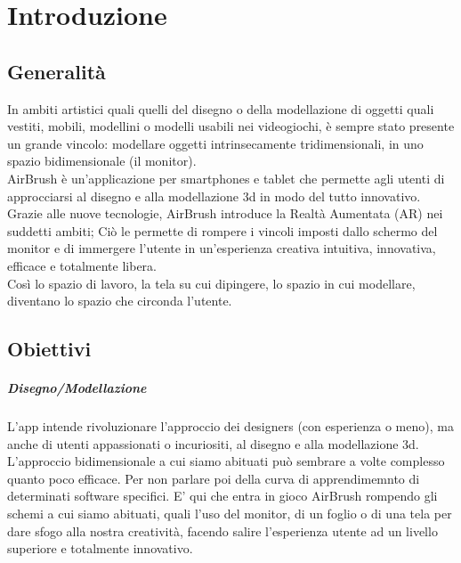\documentclass[11pt,fleqn]{book} %
\begin{document}
\pagestyle{fancy} %



\chapter{Introduzione}

\section{Generalità}
In ambiti artistici quali quelli del disegno o della modellazione di oggetti quali vestiti, mobili, modellini o modelli usabili nei videogiochi, è sempre stato presente un grande vincolo: modellare oggetti intrinsecamente tridimensionali, in uno spazio bidimensionale (il monitor).\\
AirBrush è un'applicazione per smartphones e tablet che permette agli utenti di approcciarsi al disegno e alla modellazione 3d in modo del tutto innovativo. \\
Grazie alle nuove tecnologie, AirBrush introduce la Realtà Aumentata (AR) nei suddetti ambiti; Ciò le permette di rompere i vincoli imposti dallo schermo del monitor e di immergere l'utente in un'esperienza creativa intuitiva, innovativa, efficace e totalmente libera.\\
Così lo spazio di lavoro, la tela su cui dipingere, lo spazio in cui modellare, diventano lo spazio che circonda l'utente.

\section{Obiettivi}
\paragraph{Disegno/Modellazione} L'app intende rivoluzionare l'approccio dei designers (con esperienza o meno), ma anche di utenti appassionati o incuriositi, al disegno e alla modellazione 3d. \\
L'approccio bidimensionale a cui siamo abituati può sembrare a volte complesso quanto poco efficace. Per non parlare poi della curva di apprendimemnto di determinati software specifici. E' qui che entra in gioco AirBrush rompendo gli schemi a cui siamo abituati, quali l'uso del monitor, di un foglio o di una tela per dare sfogo alla nostra creatività, facendo salire l'esperienza utente ad un livello superiore e totalmente innovativo.
\end{document}
